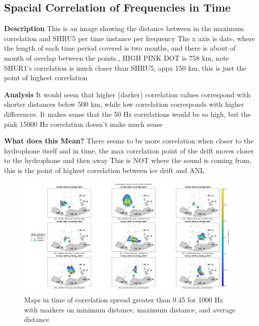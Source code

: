 \subsection{Spacial Correlation of Frequencies in Time}

\textbf{Description}
This is an image showing the distance between in the maximum correlation and SHRU5 per time instance per frequency
The x axis is date, where the length of each time period covered is two months, and there is about of month of overlap between the points.,
HIGH PINK DOT is 758 km, note SHUR1’s correlation is much closer than SHRU5, appx 150 km, this is just the point of highest correlation

\textbf{Analysis}
It would seem that higher (darker) correlation values correspond with shorter distances below 500 km, while low correlation corresponds with higher differences.
It makes sense that the 50 Hz correlations would be so high, but the pink 15000 Hz correlation doesn’t make much sense

\textbf{What does this Mean?}
There seems to be more correlation when closer to the hydrophone itself and in time, the max correlation point of the drift moves closer to the hydrophone and then away
This is NOT where the sound is coming from, this is the point of highest correlation between ice drift and ANL

\begin{figure}[h]
\centering
\includegraphics[scale=0.5]{Figures/megamap_900_1100.jpg}
\caption{Maps in time of correlation spread greater than 0.45 for 1000 Hz with markers on minimum distance, maximum distance, and average distance}
\label{fig_megamap}
\end{figure}

